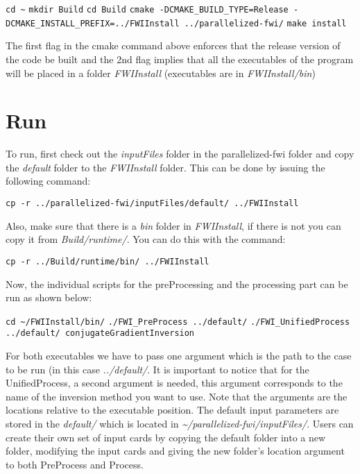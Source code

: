 \documentclass[10pt]{article}
\begin{document}
\texttt{cd \textasciitilde}
\newline
\texttt{mkdir Build}
\newline
\texttt{cd Build}
\newline
\texttt{cmake -DCMAKE\_BUILD\_TYPE=Release -DCMAKE\_INSTALL\_PREFIX=../FWIInstall ../parallelized-fwi/}
\newline
\texttt{make install} 
\newline

\noindent The first flag in the cmake command above enforces that the release version of the code be built and the 2nd flag implies that all the executables of the program will be placed in a folder \textit{FWIInstall} (executables are in \textit{FWIInstall/bin})

\section{Run}
To run, first check out the \textit{inputFiles} folder in the parallelized-fwi folder and copy the \textit{default} folder to the \textit{FWIInstall} folder. This can be done by issuing the following command: 
\newline

\texttt{cp -r ../parallelized-fwi/inputFiles/default/ ../FWIInstall} 
\newline

Also, make sure that there is a \textit{bin} folder in \textit{FWIInstall}, if there is not you can copy it from \textit{Build/runtime/}. You can do this with the command: 
\newline

\texttt{cp -r ../Build/runtime/bin/ ../FWIInstall} 
\newline

Now, the individual scripts for the preProcessing and the processing part can be run as shown below: \newline

\texttt{cd \textasciitilde/FWIInstall/bin/} \newline
\texttt{./FWI\_PreProcess ../default/} \newline
\texttt{./FWI\_UnifiedProcess ../default/ conjugateGradientInversion}
\newline

\noindent For both executables we have to pass one argument which is the path to the case to be run (in this case \textit{../default/}. It is important to notice that for the UnifiedProcess, a second argument is needed, this argument corresponds to the name of the inversion method you want to use. Note that the arguments are the locations relative to the executable position. The default input parameters are stored in the \textit{default/} which is located in \textit{\textasciitilde/parallelized-fwi/inputFiles/}. Users can create their own set of input cards by copying the default folder into a new folder, modifying the input cards and giving the new folder's location argument to both PreProcess and Process.\\
\end{document}
